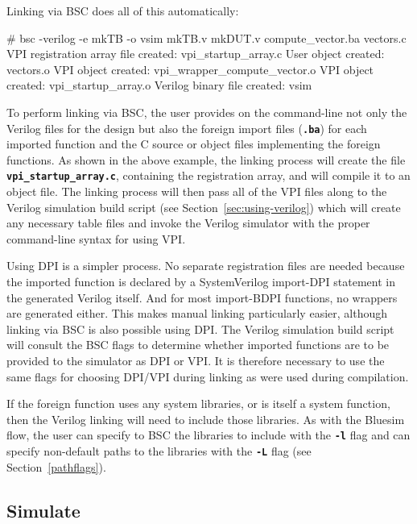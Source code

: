 \documentclass{article}
\newcommand{\te}[1]{\texttt{#1}}
\newenvironment{centerboxverbatim}
  {\center
   \boxedverbatim}
  {\endboxedverbatim
  {\endcenter }}
\begin{document}
Linking via BSC does all of this automatically:

\begin{centerboxverbatim}
# bsc -verilog -e mkTB -o vsim mkTB.v mkDUT.v compute_vector.ba vectors.c
VPI registration array file created: vpi_startup_array.c
User object created: vectors.o
VPI object created: vpi_wrapper_compute_vector.o
VPI object created: vpi_startup_array.o
Verilog binary file created: vsim
\end{centerboxverbatim}

To perform linking via BSC, the user provides on the command-line not
only the Verilog files for the design but also the foreign import files
({\bf\tt .ba}) for each imported function and the C source or object files
implementing the foreign functions.  As shown in the above example,
the linking process will create the file {\bf\tt vpi\_startup\_array.c},
containing the registration array, and will compile it to an object file.
The linking process will then pass all of the VPI files along to the
Verilog simulation build script (see Section~\ref{sec:using-verilog})
which will create any necessary table files and invoke the Verilog
simulator with the proper command-line syntax for using VPI.

Using DPI is a simpler process.  No separate registration files are
needed because the imported function is declared by a
SystemVerilog import-DPI statement in the generated Verilog itself.
And for most import-BDPI functions, no wrappers are generated either.
This makes manual linking particularly easier, although linking via
BSC is also possible using DPI.  The Verilog simulation build script
will consult the BSC flags to determine whether imported functions are
to be provided to the simulator as DPI or VPI.
It is therefore necessary to use the same flags for choosing DPI/VPI
during linking as were used during compilation.

If the foreign function uses any system libraries, or is itself a
system function, then the Verilog linking will need to include those
libraries.  As with the Bluesim flow, the user can specify to BSC
the libraries to include with the {\bf\tt -l} flag and can specify
non-default paths to the libraries with the {\bf\tt -L} flag
(see Section~\ref{pathflags}).\index{-L@\te{-L} (compiler flag)}
\index{-l@\te{-l} (compiler flag)}


\subsection{Simulate}
\label{simulate}
\end{document}
